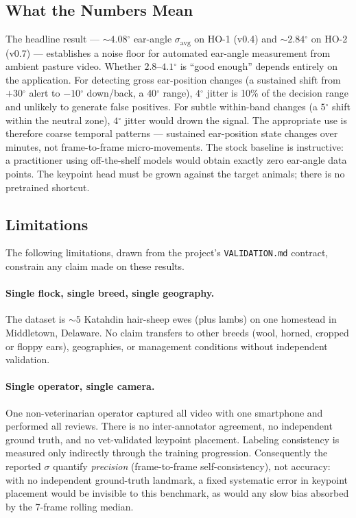 \documentclass[11pt]{article}
\newcommand{\dgr}{\ensuremath{^{\circ}}}
\newcommand{\sigavg}{\ensuremath{\sigma_{\text{avg}}}}
\begin{document}
\subsection{What the Numbers Mean}
The headline result --- ${\sim}4.08\dgr$ ear-angle $\sigavg$ on HO-1 (v0.4)
and ${\sim}2.84\dgr$ on HO-2 (v0.7) --- establishes a noise floor
for automated ear-angle measurement from ambient pasture video. Whether
$2.8$--$4.1\dgr$ is ``good enough'' depends entirely on the application. For
detecting gross ear-position changes (a sustained shift from $+30\dgr$ alert to
$-10\dgr$ down/back, a $40\dgr$ range), $4\dgr$ jitter is 10\% of the decision
range and unlikely to generate false positives. For subtle within-band changes
(a $5\dgr$ shift within the neutral zone), $4\dgr$ jitter would drown the signal.
The appropriate use is therefore coarse temporal patterns --- sustained
ear-position state changes over minutes, not frame-to-frame micro-movements. The
stock baseline is instructive: a practitioner using off-the-shelf models would
obtain exactly zero ear-angle data points. The keypoint head must be grown
against the target animals; there is no pretrained shortcut.

\subsection{Limitations}
The following limitations, drawn from the project's \texttt{VALIDATION.md}
contract, constrain any claim made on these results.

\paragraph{Single flock, single breed, single geography.} The dataset is
${\sim}5$ Katahdin hair-sheep ewes (plus lambs) on one homestead in Middletown,
Delaware. No claim transfers to other breeds (wool, horned, cropped or floppy
ears), geographies, or management conditions without independent validation.

\paragraph{Single operator, single camera.} One non-veterinarian operator
captured all video with one smartphone and performed all reviews. There is no
inter-annotator agreement, no independent ground truth, and no vet-validated
keypoint placement. Labeling consistency is measured only indirectly through the
training progression. Consequently the reported $\sigma$ quantify
\emph{precision} (frame-to-frame self-consistency), not accuracy: with no
independent ground-truth landmark, a fixed systematic error in keypoint
placement would be invisible to this benchmark, as would any slow bias absorbed
by the 7-frame rolling median.
\end{document}
